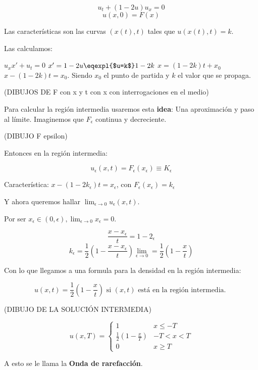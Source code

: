 			\begin{example}

				$$u_t + (1-2u)u_x = 0$$
				$$u(x,0) = F(x)$$

				Las características son las curvas $(x(t),t)$ tales que $u(x(t),t) = k$.

				Las calculamos:

				$u_x x' + u_t = 0 $
				$x' = 1-2u \eqexpl{$u=k$} 1-2k $
				$x = (1-2k)t + x_0$
				$x - (1-2k)t = x_0$. Siendo $x_0$ el punto de partida y $k$ el valor que se propaga.

				(DIBUJOS DE F con x y t con x con interrogaciones en el medio)

				Para calcular la región intermedia usaremos esta \textbf{idea}: Una aproximación y paso al límite. Imaginemos que $F_\epsilon$ continua y decreciente.

				(DIBUJO F epsilon)

				Entonces en la región intermedia:

				$$u_\epsilon (x,t) = F_\epsilon (x_\epsilon) \equiv K_\epsilon $$

				Característica: $x - (1-2k_\epsilon) t = x_\epsilon$, con $F_\epsilon(x_\epsilon) = k_\epsilon$

				Y ahora queremos hallar $\lim_{\epsilon \rightarrow 0} u_\epsilon(x,t).$

				Por ser $x_\epsilon \in (0,\epsilon), \lim_{\epsilon \rightarrow 0} x_\epsilon = 0$.

				$$ \frac{x - x_\epsilon}{t} = 1-2_\epsilon$$
				$$k_\epsilon = \frac{1}{2} (1 - \frac{x-x_\epsilon}{t}) \lim_{\epsilon \rightarrow 0} = \frac{1}{2} (1 - \frac{x}{t})$$ %

				Con lo que llegamos a una formula para la densidad en la región intermedia:

				$$u(x,t) = \frac{1}{2} (1 - \frac{x}{t}) \text{ si } (x,t) \text{ está en la región intermedia. }$$

				(DIBUJO DE LA SOLUCIÓN INTERMEDIA)

				$$u(x,T) =
				\begin{cases}
					1 & x \leq -T \\
					\frac{1}{2} (1 - \frac{x}{T}) & -T < x < T \\
					0 & x \geq T
				\end{cases}
				$$

				A esto se le llama la \textbf{Onda de rarefacción}.

			\end{example}

